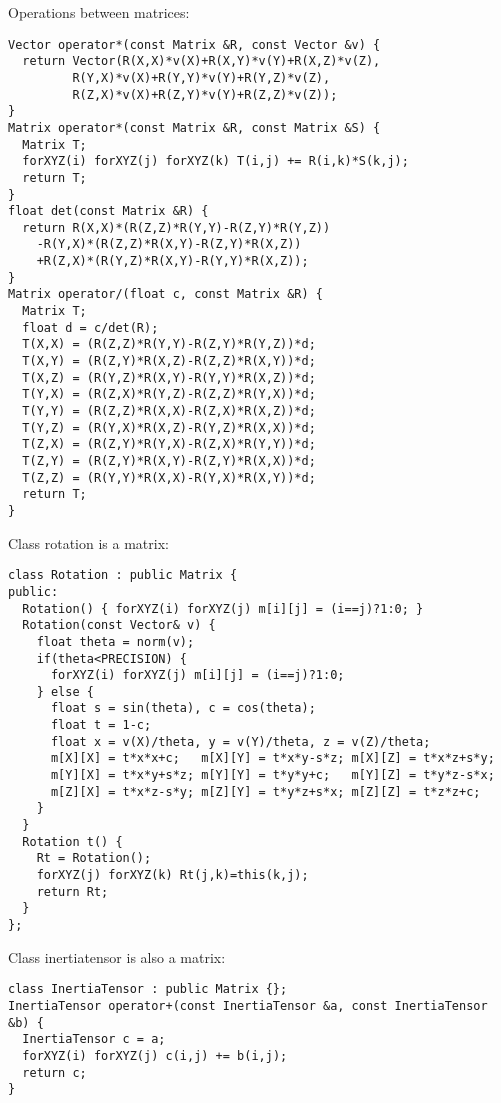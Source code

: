 \noindent
Operations between matrices: \begin{lstlisting}
Vector operator*(const Matrix &R, const Vector &v) {
  return Vector(R(X,X)*v(X)+R(X,Y)*v(Y)+R(X,Z)*v(Z),
		 R(Y,X)*v(X)+R(Y,Y)*v(Y)+R(Y,Z)*v(Z),
		 R(Z,X)*v(X)+R(Z,Y)*v(Y)+R(Z,Z)*v(Z));
}
Matrix operator*(const Matrix &R, const Matrix &S) {
  Matrix T;
  forXYZ(i) forXYZ(j) forXYZ(k) T(i,j) += R(i,k)*S(k,j);
  return T;
}
float det(const Matrix &R) {
  return R(X,X)*(R(Z,Z)*R(Y,Y)-R(Z,Y)*R(Y,Z))
    -R(Y,X)*(R(Z,Z)*R(X,Y)-R(Z,Y)*R(X,Z))
    +R(Z,X)*(R(Y,Z)*R(X,Y)-R(Y,Y)*R(X,Z));
}
Matrix operator/(float c, const Matrix &R) {
  Matrix T;
  float d = c/det(R);
  T(X,X) = (R(Z,Z)*R(Y,Y)-R(Z,Y)*R(Y,Z))*d;
  T(X,Y) = (R(Z,Y)*R(X,Z)-R(Z,Z)*R(X,Y))*d;
  T(X,Z) = (R(Y,Z)*R(X,Y)-R(Y,Y)*R(X,Z))*d;
  T(Y,X) = (R(Z,X)*R(Y,Z)-R(Z,Z)*R(Y,X))*d;
  T(Y,Y) = (R(Z,Z)*R(X,X)-R(Z,X)*R(X,Z))*d;
  T(Y,Z) = (R(Y,X)*R(X,Z)-R(Y,Z)*R(X,X))*d;
  T(Z,X) = (R(Z,Y)*R(Y,X)-R(Z,X)*R(Y,Y))*d;
  T(Z,Y) = (R(Z,Y)*R(X,Y)-R(Z,Y)*R(X,X))*d;
  T(Z,Z) = (R(Y,Y)*R(X,X)-R(Y,X)*R(X,Y))*d;
  return T;
}
\end{lstlisting}
\noindent
Class rotation is a matrix: \begin{lstlisting}
class Rotation : public Matrix {
public:
  Rotation() { forXYZ(i) forXYZ(j) m[i][j] = (i==j)?1:0; }
  Rotation(const Vector& v) {
    float theta = norm(v);    
    if(theta<PRECISION) {
      forXYZ(i) forXYZ(j) m[i][j] = (i==j)?1:0;
    } else {
      float s = sin(theta), c = cos(theta);
      float t = 1-c;
      float x = v(X)/theta, y = v(Y)/theta, z = v(Z)/theta;
      m[X][X] = t*x*x+c;   m[X][Y] = t*x*y-s*z; m[X][Z] = t*x*z+s*y;
      m[Y][X] = t*x*y+s*z; m[Y][Y] = t*y*y+c;   m[Y][Z] = t*y*z-s*x;
      m[Z][X] = t*x*z-s*y; m[Z][Y] = t*y*z+s*x; m[Z][Z] = t*z*z+c;
    }
  }
  Rotation t() {
    Rt = Rotation();
    forXYZ(j) forXYZ(k) Rt(j,k)=this(k,j);
    return Rt;      
  }
};
\end{lstlisting}
\noindent
Class inertiatensor is also a matrix: \begin{lstlisting}
class InertiaTensor : public Matrix {};
InertiaTensor operator+(const InertiaTensor &a, const InertiaTensor &b) {
  InertiaTensor c = a;
  forXYZ(i) forXYZ(j) c(i,j) += b(i,j);
  return c;
}
\end{lstlisting}
\noindent
